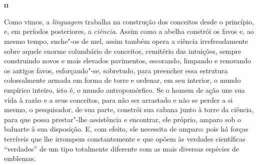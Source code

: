 \chapter*{}

\textsc{\textbf{ii}}
\bigskip

Como vimos, a \textit{linguagem} trabalha na construção dos conceitos
desde o princípio, e, em períodos posteriores, a \textit{ciência}.
Assim como a abelha constrói os favos e, ao mesmo tempo, enche"-os de
mel, assim também opera a ciência irrefreadamente sobre aquele enorme
columbário de conceitos, cemitério das intuições, sempre construindo
novos e mais elevados pavimentos, escorando, limpando e renovando os
antigos favos, esforçando"-se, sobretudo, para preencher essa
estrutura colossalmente armada em forma de torre e ordenar, em seu
interior, o mundo empírico inteiro, isto é, o mundo antropomórfico. Se
o homem de ação une sua vida à razão e a seus conceitos, para não ser
arrastado e não se perder a si mesmo, o pesquisador, de sua parte,
constrói sua cabana junto à torre da ciência, para que possa
prestar"-lhe assistência e encontrar, ele próprio, amparo sob o
baluarte à sua disposição. E, com efeito, ele necessita de amparo: pois
há forças terríveis que lhe irrompem constantemente e que opõem às
verdades científicas “verdades” de um tipo totalmente diferente com as
mais diversas espécies de emblemas.

